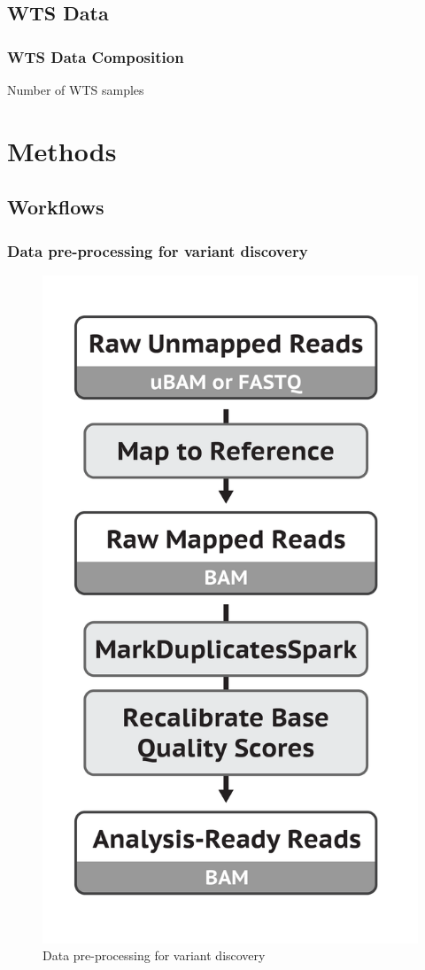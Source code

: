 \documentclass{beamer}
\begin{document}
    \subsection{WTS Data}
    \begin{frame}
        \frametitle{WTS Data Composition}

        \begin{table}
            \caption{Number of WTS samples}
            
        \end{table}
    \end{frame}

    \section{Methods}
    \subsection{Workflows}
    \begin{frame}
        \frametitle{Data pre-processing for variant discovery}

        \begin{figure}
            \includegraphics[width=0.3 \linewidth]{figures/Workflow/mapping.png}
            \caption{Data pre-processing for variant discovery \protect\cite{gatk1, gatk2}}
        \end{figure}
    \end{frame}
\end{document}
